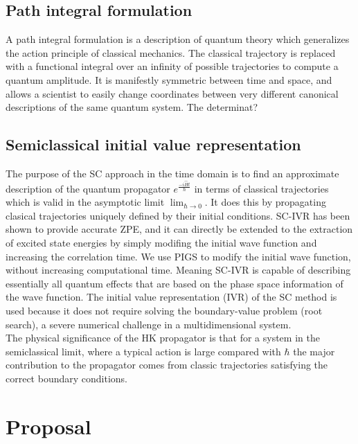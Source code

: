 \documentclass[12pt,letterpaper,oneside,final,titlepage]{article}               %
\numberwithin{equation}{section} %
\newcommand{\emiHt}{e^{\frac{-i\hat{H}t}{\hbar}}}
\begin{document}
\subsection{Path integral formulation}
A path integral formulation is a description of quantum theory which generalizes the action principle of classical mechanics.
The classical trajectory is replaced with a functional integral over an infinity of possible trajectories to compute a quantum amplitude.
It is manifestly symmetric between time and space, and allows a scientist to easily change coordinates between very different canonical descriptions of the same quantum system. 
The determinat?


\subsection{Semiclassical initial value representation}
The purpose of the SC approach in the time domain is to find an approximate description of the quantum propagator $\emiHt$ 
in terms of classical trajectories which is valid in the asymptotic limit $\lim_{\hbar \to 0}$.
It does this by propagating clasical trajectories uniquely defined by their initial conditions.
SC-IVR has been shown to provide accurate ZPE, and it can directly be extended to the extraction of excited state energies by simply modifing the initial wave function and increasing the correlation time. 
We use PIGS to modify the initial wave function, without increasing computational time. 
Meaning SC-IVR is capable of describing essentially all quantum effects that are based on the phase space information of the wave function.
The initial value representation (IVR) of the SC method is used because it does not require solving the boundary-value problem (root search), a severe numerical challenge in a multidimensional system. \\
The physical significance of the HK propagator is that for a system in the semiclassical limit, where a typical action is large compared with $\hbar$ the major contribution to the propagator comes from classic trajectories satisfying the correct boundary conditions.




\section{Proposal}
\end{document}
